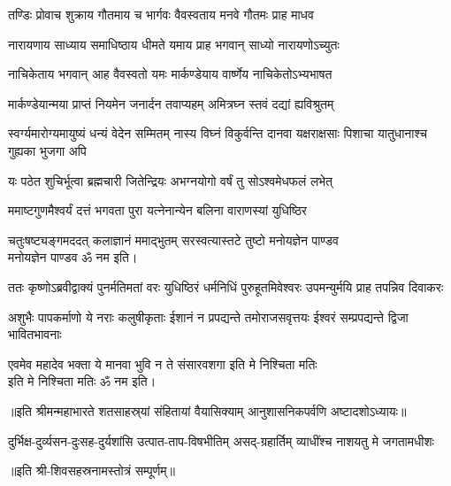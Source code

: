 \twolineshloka
{तण्डिः प्रोवाच शुक्राय गौतमाय च भार्गवः}
{वैवस्वताय मनवे गौतमः प्राह माधव}%

\twolineshloka
{नारायणाय साध्याय समाधिष्ठाय धीमते}
{यमाय प्राह भगवान् साध्यो नारायणोऽच्युतः}%

\twolineshloka
{नाचिकेताय भगवान् आह वैवस्वतो यमः}
{मार्कण्डेयाय वार्ष्णेय नाचिकेतोऽभ्यभाषत}%

\twolineshloka
{मार्कण्डेयान्मया प्राप्तं नियमेन जनार्दन}
{तवाप्यहम् अमित्रघ्न स्तवं दद्यां ह्यविश्रुतम्}%



\threelineshloka
{स्वर्ग्यमारोग्यमायुष्यं धन्यं वेदेन सम्मितम्}
{नास्य विघ्नं विकुर्वन्ति दानवा यक्षराक्षसाः}
{पिशाचा यातुधानाश्च गुह्यका भुजगा अपि}%

\twolineshloka
{यः पठेत शुचिर्भूत्वा ब्रह्मचारी जितेन्द्रियः}
{अभग्नयोगो वर्षं तु सोऽश्वमेधफलं लभेत्}%

\twolineshloka
{ममाष्टगुणमैश्वर्यं दत्तं भगवता पुरा}
{यत्नेनान्येन बलिना वाराणस्यां युधिष्ठिर}%


\twolineshloka
{चतुःषष्ट्यङ्गमददत् कलाज्ञानं ममाद्भुतम्}
{सरस्वत्यास्तटे तुष्टो मनोयज्ञेन पाण्डव}\mbox{}\\[-1.6em]%
मनोयज्ञेन पाण्डव ॐ नम इति।

\threelineshloka
{ततः कृष्णोऽब्रवीद्वाक्यं पुनर्मतिमतां वरः}
{युधिष्ठिरं धर्मनिधिं पुरुहूतमिवेश्वरः}
{उपमन्युर्मयि प्राह तपन्निव दिवाकरः}%

\threelineshloka
{अशुभैः पापकर्माणो ये नराः कलुषीकृताः}
{ईशानं न प्रपद्यन्ते तमोराजसवृत्तयः}
{ईश्वरं सम्प्रपद्यन्ते द्विजा भावितभावनाः}%


\twolineshloka
{एवमेव महादेव भक्ता ये मानवा भुवि}
{न ते संसारवशगा इति मे निश्चिता मतिः}\mbox{}\\[-1.6em]%
इति मे निश्चिता मतिः ॐ नम इति।

॥इति श्रीमन्महाभारते शतसाहस्र्यां संहितायां वैयासिक्याम् आनुशासनिकपर्वणि अष्टादशोऽध्यायः॥

{दुर्भिक्ष-दुर्व्यसन-दुःसह-दुर्यशांसि}
{उत्पात-ताप-विषभीतिम् असद्‌-ग्रहार्तिम्}
{व्याधींश्च नाशयतु मे जगतामधीशः}

॥इति श्री-शिवसहस्रनामस्तोत्रं सम्पूर्णम्॥

\hyperref[sec:start_ShivaSahasranamaStotram]{\closesection}